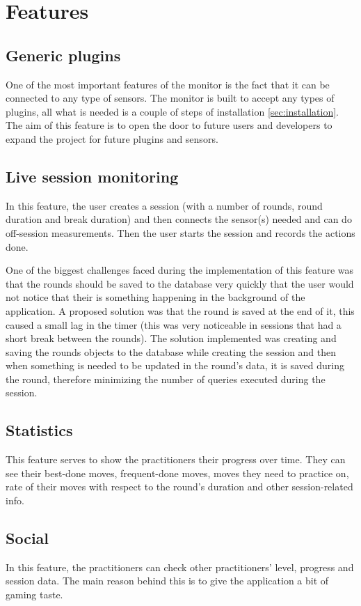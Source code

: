 \chapter{Features}\label{chap:features}

\section{Generic plugins}
One of the most important features of the monitor is the fact that it can be connected to any type of sensors. The monitor is built to accept any types of plugins, all what is needed is a couple of steps of installation \ref{sec:installation}. The aim of this feature is to open the door to future users and developers to expand the project for future plugins and sensors.

\section{Live session monitoring}
In this feature, the user creates a session (with a number of rounds, round duration and break duration) and then connects the sensor(s) needed and can do off-session measurements. Then the user starts the session and records the actions done.

One of the biggest challenges faced during the implementation of this feature was that the rounds should be saved to the database very quickly that the user would not notice that their is something happening in the background of the application. A proposed solution was that the round is saved at the end of it, this caused a small lag in the timer (this was very noticeable in sessions that had a short break between the rounds). The solution implemented was creating and saving the rounds objects to the database while creating the session and then when something is needed to be updated in the round's data, it is saved during the round, therefore minimizing the number of queries executed during the session.

\section{Statistics}

This feature serves to show the practitioners their progress over time. They can see their best-done moves, frequent-done moves, moves they need to practice on, rate of their moves with respect to the round's duration and other session-related info.

\section{Social}

In this feature, the practitioners can check other practitioners' level, progress and session data. The main reason behind this is to give the application a bit of gaming taste.